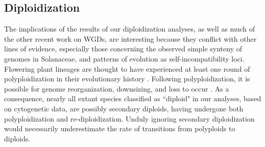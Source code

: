 \subsection*{Diploidization}


The implications of the results of our diploidization analyses, as well as much of the other recent work on WGDs, are interesting because they conflict with other lines of evidence, especially those concerning the observed simple synteny of genomes in Solanaceae, and patterns of evolution as self-incompatibility loci.
Flowering plant lineages are thought to have experienced at least one round of polyploidization in their evolutionary history \citep{soltis_2015}. 
Following polyploidization, it is possible for genome reorganization, downsizing, and loss to occur \citep{dodsworth_2015, zenil_2016, mandakova_2018}. %
As a consequence, nearly all extant species classified as ``diploid" in our analyses, based on cytogenetic data, are possibly secondary diploids, having undergone both polyploidization and re-diploidization.
Unduly ignoring secondary diploidization would necessarily underestimate the rate of transitions from polyploids to diploids.
